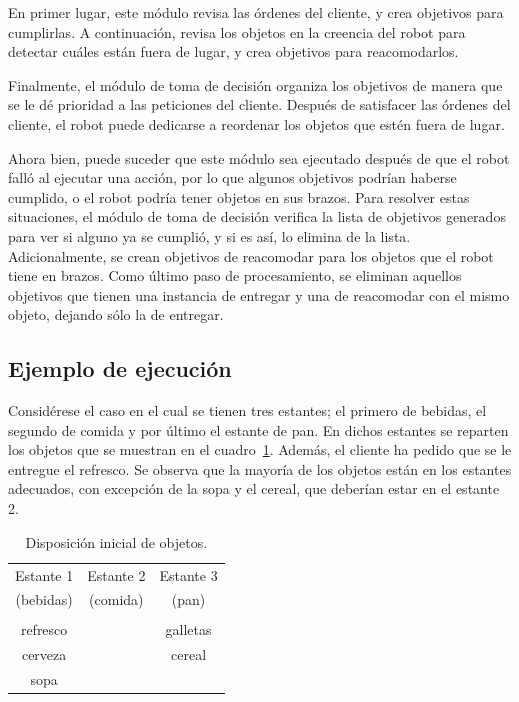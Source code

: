 \documentclass[11pt]{article}
\begin{document}
En primer lugar, este módulo revisa las órdenes del cliente, y crea objetivos para cumplirlas. A continuación, revisa los objetos en la creencia del robot para detectar cuáles están fuera de lugar, y crea objetivos para reacomodarlos.

Finalmente, el módulo de toma de decisión organiza los objetivos de manera que se le dé prioridad a las peticiones del cliente. Después de satisfacer las órdenes del cliente, el robot puede dedicarse a reordenar los objetos que estén fuera de lugar.

Ahora bien, puede suceder que este módulo sea ejecutado después de que el robot falló al ejecutar una acción, por lo que algunos objetivos podrían haberse cumplido, o el robot podría tener objetos en sus brazos. Para resolver estas situaciones, el módulo de toma de decisión verifica la lista de objetivos generados para ver si alguno ya se cumplió, y si es así, lo elimina de la lista. Adicionalmente, se crean objetivos de reacomodar para los objetos que el robot tiene en brazos. Como último paso de procesamiento, se eliminan aquellos objetivos que tienen una instancia de entregar y una de reacomodar con el mismo objeto, dejando sólo la de entregar.

\subsection{Ejemplo de ejecución}

Considérese el caso en el cual se tienen tres estantes; el primero de bebidas, el segundo de comida y por último el estante de pan. En dichos estantes se reparten los objetos que se muestran en el cuadro~\ref{tab:EjemploDecision}. Además, el cliente ha pedido que se le entregue el refresco. Se observa que la mayoría de los objetos están en los estantes adecuados, con excepción de la sopa y el cereal, que deberían estar en el estante 2.

\begin{table}
    \centering
    \caption{Disposición inicial de objetos.}
    \label{tab:EjemploDecision}
    \begin{tabular}{c | c | c}
        Estante 1 & Estante 2 & Estante 3 \\
        (bebidas) & (comida) & (pan) \\
        \hline \\
        refresco & & galletas \\
        cerveza & & cereal \\
        sopa & &
    \end{tabular}
\end{table}
\end{document}
